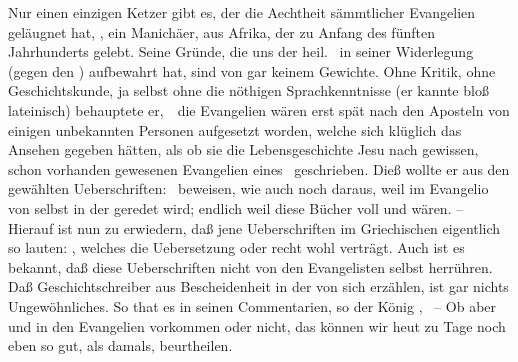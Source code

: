 \begin{aufza}
\begin{aufzb}
\item Nur einen einzigen Ketzer gibt es, der die Aechtheit sämmtlicher Evangelien geläugnet hat, , ein Manichäer, aus Afrika, der zu Anfang des fünften Jahrhunderts gelebt. Seine Gründe, die uns der heil.\  in seiner Widerlegung (gegen den ) aufbewahrt hat, sind von gar keinem Gewichte. Ohne Kritik, ohne Geschichtskunde, ja selbst ohne die nöthigen Sprachkenntnisse (er kannte bloß lateinisch) behauptete er,~\ die Evangelien wären erst spät nach den Aposteln von einigen unbekannten Personen aufgesetzt worden, welche sich klüglich das Ansehen gegeben hätten, als ob sie die Lebensgeschichte Jesu nach gewissen, schon vorhanden gewesenen Evangelien eines  \usw\ geschrieben. Dieß wollte er aus den gewählten Ueberschriften:  \usw\ beweisen, wie auch noch daraus, weil im Evangelio  von  selbst in der  geredet wird; endlich weil diese Bücher voll  und  wären. -- Hierauf ist nun zu erwiedern, daß jene Ueberschriften im Griechischen eigentlich so lauten:  \usw , welches die Uebersetzung  oder  recht wohl verträgt. Auch ist es bekannt, daß diese Ueberschriften nicht von den Evangelisten selbst herrühren. Daß Geschichtschreiber aus Bescheidenheit in der  von sich erzählen, ist gar nichts Ungewöhnliches. So that es  in seinen Commentarien, so der König , \uA\ -- Ob aber  und  in den Evangelien vorkommen oder nicht, das können wir heut zu Tage noch eben so gut, als  damals, beurtheilen.
\end{aufzb}
\end{aufza}

